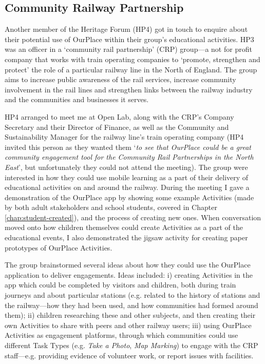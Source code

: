 \subsection{Community Railway Partnership}

Another member of the Heritage Forum (HP4) got in touch to enquire about their potential use of OurPlace within their group's educational activities. HP3 was an officer in a `community rail partnership' (CRP) group---a not for profit company that works with train operating companies to `promote, strengthen and protect' the role of a particular railway line in the North of England. The group aims to increase public awareness of the rail services, increase community involvement in the rail lines and strengthen links between the railway industry and the communities and businesses it serves.

HP4 arranged to meet me at Open Lab, along with the CRP's Company Secretary and their Director of Finance, as well as the Community and Sustainability Manager for the railway line's train operating company (HP4 invited this person as they wanted them `\textit{to see that OurPlace could be a great community engagement tool for the Community Rail Partnerships in the North East}', but unfortunately they could not attend the meeting). The group were interested in how they could use mobile learning as a part of their delivery of educational activities on and around the railway. During the meeting I gave a demonstration of the OurPlace app by showing some example Activities (made by both adult stakeholders and school students, covered in Chapter \ref{chap:student-created}), and the process of creating new ones. When conversation moved onto how children themselves could create Activities as a part of the educational events, I also demonstrated the jigsaw activity for creating paper prototypes of OurPlace Activities.

The group brainstormed several ideas about how they could use the OurPlace application to deliver engagements. Ideas included: i) creating Activities in the app which could be completed by visitors and children, both during train journeys and about particular stations (e.g. related to the history of stations and the railway---how they had been used, and how communities had formed around them); ii) children researching these and other subjects, and then creating their own Activities to share with peers and other railway users; iii) using OurPlace Activities as engagement platforms, through which communities could use different Task Types (e.g. \textit{Take a Photo},\textit{ Map Marking}) to engage with the CRP staff---e.g. providing evidence of volunteer work, or report issues with facilities. 

